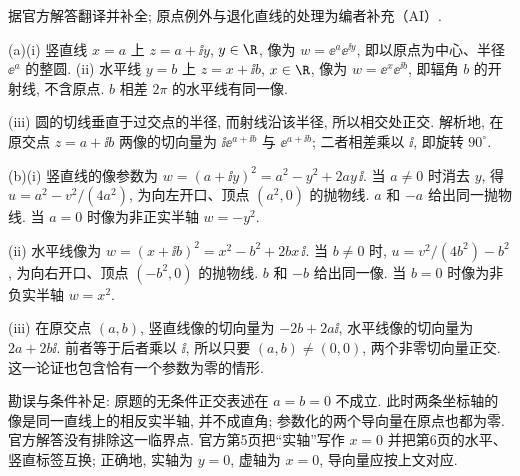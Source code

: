 \begin{solution}
据官方解答翻译并补全; 原点例外与退化直线的处理为编者补充（AI）.

(a)(i) 竖直线 $x=a$ 上 $z=a+\ii y$, $y\in\R$, 像为
$w=\ee^a\ee^{\ii y}$, 即以原点为中心、半径 $\ee^a$ 的整圆.
(ii) 水平线 $y=b$ 上 $z=x+\ii b$, $x\in\R$, 像为
$w=\ee^x\ee^{\ii b}$, 即辐角 $b$ 的开射线, 不含原点. $b$ 相差 $2\pi$ 的水平线有同一像.
\begin{center}
\end{center}
(iii) 圆的切线垂直于过交点的半径, 而射线沿该半径, 所以相交处正交. 解析地, 在原交点 $z=a+\ii b$ 两像的切向量为 $\ii\ee^{a+\ii b}$ 与 $\ee^{a+\ii b}$; 二者相差乘以 $\ii$, 即旋转 $90^\circ$.

(b)(i) 竖直线的像参数为
$w=(a+\ii y)^2=a^2-y^2+2a y\,\ii$.
当 $a\ne0$ 时消去 $y$, 得 $u=a^2-v^2/(4a^2)$, 为向左开口、顶点 $(a^2,0)$ 的抛物线. $a$ 和 $-a$ 给出同一抛物线. 当 $a=0$ 时像为非正实半轴 $w=-y^2$.

(ii) 水平线像为 $w=(x+\ii b)^2=x^2-b^2+2bx\,\ii$. 当 $b\ne0$ 时, $u=v^2/(4b^2)-b^2$, 为向右开口、顶点 $(-b^2,0)$ 的抛物线. $b$ 和 $-b$ 给出同一像. 当 $b=0$ 时像为非负实半轴 $w=x^2$.
\begin{center}
\end{center}
(iii) 在原交点 $(a,b)$, 竖直线像的切向量为
$-2b+2a\ii$, 水平线像的切向量为 $2a+2b\ii$. 前者等于后者乘以 $\ii$, 所以只要 $(a,b)\ne(0,0)$, 两个非零切向量正交. 这一论证也包含恰有一个参数为零的情形.

勘误与条件补足: 原题的无条件正交表述在 $a=b=0$ 不成立. 此时两条坐标轴的像是同一直线上的相反实半轴, 并不成直角; 参数化的两个导向量在原点也都为零. 官方解答没有排除这一临界点. 官方第5页把“实轴”写作 $x=0$ 并把第6页的水平、竖直标签互换; 正确地, 实轴为 $y=0$, 虚轴为 $x=0$, 导向量应按上文对应.
\end{solution}

